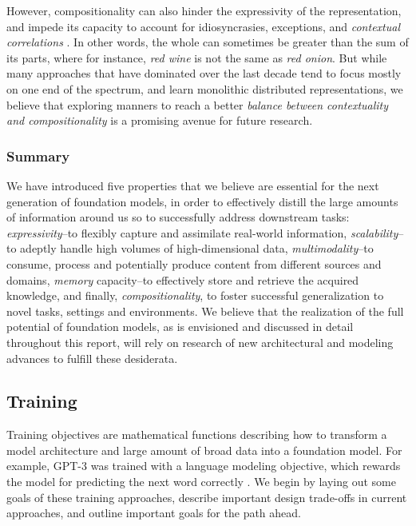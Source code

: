 However, compositionality can also hinder the expressivity of the representation, and impede its capacity to account for idiosyncrasies, exceptions, and \textit{contextual correlations} \citep{redwine}. In other words, the whole can sometimes be greater than the sum of its parts, where for instance, \textit{red wine} is not the same as \textit{red onion}. But while many approaches that have dominated over the last decade tend to focus mostly on one end of the spectrum, and learn monolithic distributed representations, we believe that exploring manners to reach a better \textit{balance between contextuality and compositionality} is a promising avenue for future research.

\subsubsection{Summary}
We have introduced five properties that we believe are essential for the next generation of foundation models, in order to effectively distill the large amounts of information around us so to successfully address downstream tasks: \textit{expressivity}--to flexibly capture and assimilate real-world information, \textit{scalability}--to adeptly handle high volumes of high-dimensional data, \textit{multimodality}--to consume, process and potentially produce content from different sources and domains, \textit{memory} capacity--to effectively store and retrieve the acquired knowledge, and finally, \textit{compositionality}, to foster successful generalization to novel tasks, settings and environments. We believe that the realization of the full potential of foundation models, as is envisioned and discussed in  detail throughout this report, will rely on research of new architectural and modeling advances to fulfill these desiderata.

\newsection
\subsection{Training}
\label{sec:training}

Training objectives are mathematical functions describing how to transform a model architecture and large amount of broad data into a foundation model. For example, GPT-3 was trained with a language modeling objective, which rewards the model for predicting the next word correctly \citep{Shannon1948AMT}. We begin by laying out some goals of these training approaches, describe important design trade-offs in current approaches, and outline important goals for the path ahead.


